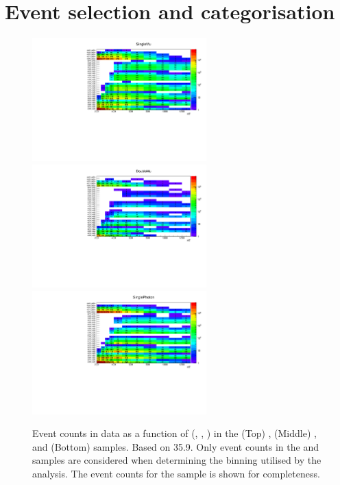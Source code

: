 \section{Event selection and categorisation}
\label{app:selection}

\begin{figure}[h!]
  \begin{center}
    {\includegraphics[width=0.6\textwidth]{figures/control_regions/SingleMu.pdf}} 
    {\includegraphics[width=0.6\textwidth]{figures/control_regions/DoubleMu.pdf}}
    {\includegraphics[width=0.6\textwidth]{figures/control_regions/SinglePhoton.pdf}}
    \caption{Event counts in data as a function of (\njet, \nb,
      \scalht) in the (Top) \mj, (Middle) \mmj, and (Bottom) \gj
      samples. Based on 35.9\fbinv. Only event counts in the \mj and
      \mmj samples are considered when determining the binning
      utilised by the analysis. The event counts for the \gj sample is
      shown for completeness.} 
    \label{fig:cr-counts}
  \end{center}
\end{figure}


